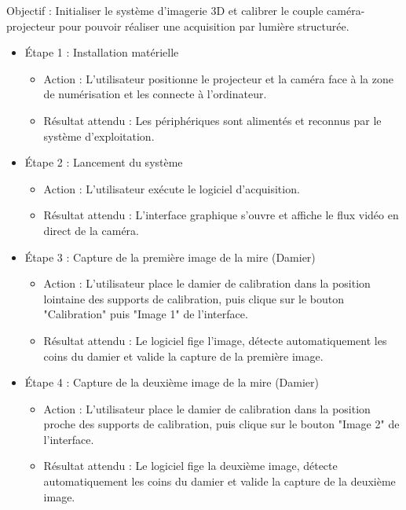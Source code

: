 \documentclass[10pt]{article} %
\begin{document}
Objectif : Initialiser le système d'imagerie 3D et calibrer le couple caméra-projecteur pour pouvoir réaliser une acquisition par lumière structurée.

\begin{itemize}
    \item{Étape 1 : Installation matérielle}
    \begin{itemize}
        \item{Action : L'utilisateur positionne le projecteur et la caméra face à la zone de numérisation et les connecte à l'ordinateur.}

        \item{Résultat attendu : Les périphériques sont alimentés et reconnus par le système d'exploitation.}
    \end{itemize}

    \item{Étape 2 : Lancement du système}
    \begin{itemize}
        \item{Action : L'utilisateur exécute le logiciel d'acquisition.}
        \item{Résultat attendu : L'interface graphique s'ouvre et affiche le flux vidéo en direct de la caméra.}
    \end{itemize}

    \item{Étape 3 : Capture de la première image de la mire (Damier)}
    \begin{itemize}
        \item{Action : L'utilisateur place le damier de calibration dans la position lointaine des supports de calibration, puis clique sur le bouton "Calibration" puis "Image 1" de l'interface.}
        \item{Résultat attendu : Le logiciel fige l'image, détecte automatiquement les coins du damier et valide la capture de la première image.}
    \end{itemize}

    \item{Étape 4 : Capture de la deuxième image de la mire (Damier)}
    \begin{itemize}
        \item{Action : L'utilisateur place le damier de calibration dans la position proche des supports de calibration, puis clique sur le bouton "Image 2" de l'interface.}
        \item{Résultat attendu : Le logiciel fige la deuxième image, détecte automatiquement les coins du damier et valide la capture de la deuxième image.}
    \end{itemize}


\end{itemize}
\end{document}
